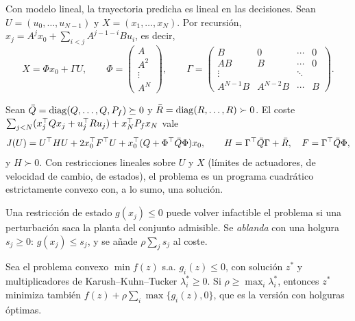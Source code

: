Con modelo lineal, la trayectoria predicha es lineal en las decisiones. Sean $U=(u_0,\dots,u_{N-1})$ y $X=(x_1,\dots,x_N)$. Por recursión, $x_j=A^{j}x_0+\sum_{i<j}A^{j-1-i}Bu_i$, es decir,
\begin{equation}\label{eq:condensada}
X=\Phi x_0+\Gamma U,\qquad \Phi=\begin{pmatrix}A\\A^{2}\\\vdots\\A^{N}\end{pmatrix},\qquad \Gamma=\begin{pmatrix}B&0&\cdots&0\\AB&B&\cdots&0\\\vdots&&\ddots&\\A^{N-1}B&A^{N-2}B&\cdots&B\end{pmatrix}.
\end{equation}

\begin{proposicion}\label{prop:qp}
Sean $\bar Q=\operatorname{diag}(Q,\dots,Q,P_f)\succeq0$ y $\bar R=\operatorname{diag}(R,\dots,R)\succ0$. El coste $\sum_{j<N}(x_j^{\top} Qx_j+u_j^{\top} Ru_j)+x_N^{\top} P_fx_N$ vale
\[
J(U)=U^{\top} HU+2x_0^{\top} F^{\top} U+x_0^{\top}(Q+\Phi^{\top}\bar Q\Phi)x_0,\qquad H=\Gamma^{\top}\bar Q\Gamma+\bar R,\quad F=\Gamma^{\top}\bar Q\Phi,
\]
y $H\succ0$. Con restricciones lineales sobre $U$ y $X$ (límites de actuadores, de velocidad de cambio, de estados), el problema es un programa cuadrático estrictamente convexo con, a lo sumo, una solución.
\end{proposicion}

\addtocounter{definicion}{1}%

\begin{definicion}\label{def:blandas}
Una restricción de estado $g(x_j)\le0$ puede volver infactible el problema si una perturbación saca la planta del conjunto admisible. Se \emph{ablanda} con una holgura $s_j\ge0$: $g(x_j)\le s_j$, y se añade $\rho\sum_js_j$ al coste.
\end{definicion}

\begin{proposicion}\label{prop:exacta}
Sea el problema convexo $\min f(z)$ s.a. $g_i(z)\le0$, con solución $z^{*}$ y multiplicadores de Karush--Kuhn--Tucker $\lambda_i^{*}\ge0$. Si $\rho\ge\max_i\lambda_i^{*}$, entonces $z^{*}$ minimiza también $f(z)+\rho\sum_i\max\{g_i(z),0\}$, que es la versión con holguras óptimas.
\end{proposicion}

